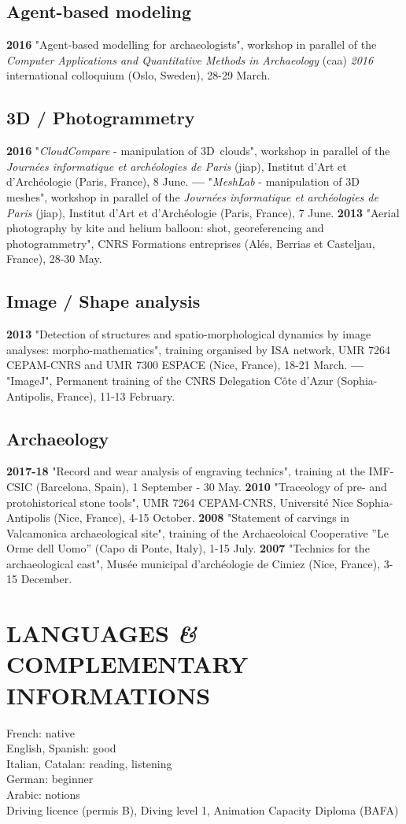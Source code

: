 \documentclass{article}
\begin{document}
\subsection*{Agent-based modeling}

\textbf{2016 }"Agent-based modelling for archaeologists", workshop in parallel of the \textit{Computer Applications and Quantitative Methods in Archaeology }(caa) \textit{2016 }international colloquium (Oslo, Sweden), 28-29 March.

\subsection*{3D / Photogrammetry}

\textbf{2016 }"\textit{CloudCompare} - manipulation of 3D~clouds", workshop in parallel of the \textit{Journ\'{e}es informatique et arch\'{e}ologies de Paris} (jiap), Institut d'Art et d'Arch\'{e}ologie (Paris, France), 8 June.
\smallbreak
\textbf{---  }"\textit{MeshLab }- manipulation of 3D\textit{ }meshes", workshop in parallel of the \textit{Journ\'{e}es informatique et arch\'{e}ologies de Paris} (jiap), Institut d'Art et d'Arch\'{e}ologie (Paris, France), 7 June.
\smallbreak
\textbf{2013 }"Aerial photography by kite and helium balloon: shot, georeferencing and photogrammetry", CNRS Formations entreprises (Al\'{e}s, Berrias et Casteljau, France), 28-30 May.

\subsection*{Image / Shape analysis}

\textbf{2013 }"Detection of structures and spatio-morphological dynamics by image analyses: morpho-mathematics", training organised by ISA network, UMR 7264 CEPAM-CNRS and UMR 7300 ESPACE (Nice, France), 18-21 March.
\smallbreak
\textbf{---  }"ImageJ", Permanent training of the CNRS Delegation C\^{o}te d'Azur (Sophia-Antipolis, France), 11-13 February.

\subsection*{Archaeology}

\textbf{2017-18 } "Record and wear analysis of engraving technics", training at the IMF-CSIC (Barcelona, Spain), 1 September - 30 May.
\smallbreak
\textbf{2010 } "Traceology of pre- and protohistorical stone tools", UMR 7264 CEPAM-CNRS, Universit\'{e} Nice Sophia-Antipolis (Nice, France), 4-15 October.
\smallbreak
\textbf{2008 } "Statement of carvings in Valcamonica archaeological site", training of the Archaeoloical Cooperative ''Le Orme dell Uomo'' (Capo di Ponte, Italy), 1-15 July.
\smallbreak
\textbf{2007 } "Technics for the archaeological cast", Mus\'{e}e municipal d'arch\'{e}ologie de Cimiez (Nice, France), 3-15 December.

\section{LANGUAGES \textit{\&} COMPLEMENTARY INFORMATIONS}

French: native \\
English, Spanish: good \\
Italian, Catalan: reading, listening \\
German: beginner \\
Arabic: notions \\

Driving licence (permis B), Diving level 1, Animation Capacity Diploma (BAFA)
\end{document}
